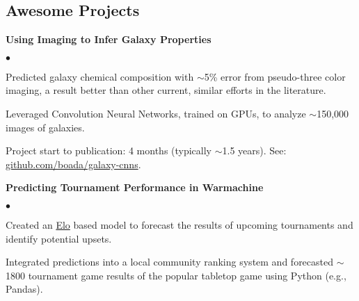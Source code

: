 \documentclass[margin,line, 11pt]{res}
\newenvironment{list2}{
  \begin{list}{$\bullet$}{%
      \setlength{\itemsep}{0in}
      \setlength{\parsep}{0in} \setlength{\parskip}{0in}
      \setlength{\topsep}{0in} \setlength{\partopsep}{0in}
      \setlength{\leftmargin}{0.2in}}}{\end{list}}
\begin{document}
\begin{resume}

\section{Awesome Projects}
\textbf{Using Imaging to Infer Galaxy Properties}\newline
    \begin{list2}
    	\vspace*{-5mm}
      \item Predicted galaxy chemical composition with $\sim$5\% error from pseudo-three color imaging, a result better than other current, similar efforts in the literature.
    	\item Leveraged Convolution Neural Networks, trained on GPUs, to analyze $\sim$150,000 images of galaxies.
      \item Project start to publication: 4 months (typically $\sim$1.5 years). See: \href{https://github.com/boada/galaxy-cnns}{github.com/boada/galaxy-cnns}.
    \end{list2}
    \vspace*{-3mm}

\textbf{Predicting Tournament Performance in Warmachine}\newline
    \begin{list2}
    	\vspace*{-5mm}
    	\item Created an \href{https://en.wikipedia.org/wiki/Elo_rating_system}{Elo} based model to forecast the results of upcoming tournaments and identify potential upsets.
    	\item Integrated predictions into a local community ranking system and forecasted $\sim$1800 tournament game results of the popular tabletop game using Python (e.g., Pandas).
    \end{list2}
\vspace*{-1mm}


\end{resume}
\end{document}
